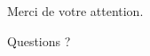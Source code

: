 \documentclass[french]{beamer}
\begin{document}











\begin{frame}
\huge

\begin{center}
Merci de votre attention.

\vspace{1cm}

Questions ?
\end{center}
\end{frame}
\end{document}
